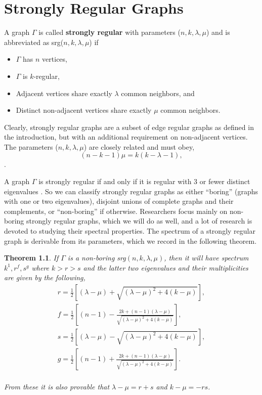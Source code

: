 \documentclass[12pt]{report}
\newtheorem{thm}{Theorem}[chapter]
\theoremstyle{definition}
\begin{document}
\chapter{Strongly Regular Graphs}
A graph $\Gamma$ is called \textbf{strongly regular} with parameters ($n,k,\lambda,\mu$) and is abbreviated as srg($n,k,\lambda,\mu$) if
\begin{itemize}
    \item $\Gamma$ has $n$ vertices,
    \item $\Gamma$ is $k$-regular,
    \item Adjacent vertices share exactly $\lambda$ common neighbors, and
    \item Distinct non-adjacent vertices share exactly $\mu$ common neighbors.
\end{itemize}
Clearly, strongly regular graphs are a subset of edge regular graphs as defined in the introduction, but with an additional requirement on non-adjacent vertices.
 The parameters ($n,k,\lambda,\mu$) are closely related and must obey, 
\begin{equation}\label{eq:srg}(n-k-1)\mu=k(k-\lambda-1),\end{equation}
 \cite[Theorem 9.1.3]{haemers}.\par
 A graph $\Gamma$ is strongly regular if and only if it is regular with 3 or fewer distinct eigenvalues \cite[Theorem 9.1.2]{haemers}. So we can classify strongly regular graphs as either ``boring'' (graphs with one or two eigenvalues), disjoint unions of complete graphs and their complements, or ``non-boring'' if otherwise. Researchers focus mainly on non-boring strongly regular graphs, which we will do as well, and a lot of research is devoted to studying their spectral properties. The spectrum of a strongly regular graph is derivable from its parameters, which we record in the following theorem.
 \clearpage
 \begin{thm}\label{thm:srgspec}\cite[Theorem 9.1.2]{haemers} If $\Gamma$ is a non-boring srg$(n,k,\lambda, \mu)$, then it will have spectrum $k^1, r^f, s^g$ where $k>r>s$ and the latter two eigenvalues and their multiplicities are given by the following,
\begin{equation}\label{eq:srgspec}\begin{split}r = \frac{1}{2}\left[(\lambda - \mu) + \sqrt{(\lambda - \mu)^2+4(k-\mu)}\right],\\
f = \frac{1}{2}\left[(n-1)-\frac{2k + (n-1)(\lambda-\mu)}{\sqrt{(\lambda - \mu)^2+4(k-\mu)}}\right],\\
s = \frac{1}{2}\left[(\lambda - \mu) - \sqrt{(\lambda - \mu)^2+4(k-\mu)}\right],\\
g = \frac{1}{2}\left[(n-1)+\frac{2k + (n-1)(\lambda-\mu)}{\sqrt{(\lambda - \mu)^2+4(k-\mu)}}\right].\end{split}\end{equation}\\
From these it is also provable that $\lambda -\mu = r+s$ and $k-\mu = -rs$.\end{thm}
\end{document}
